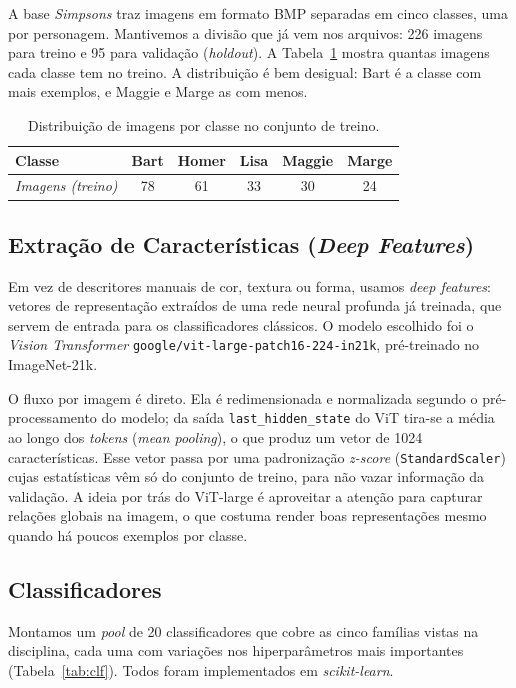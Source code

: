 \documentclass[12pt]{article}
\begin{document}
A base \textit{Simpsons} traz imagens em formato BMP separadas em cinco classes,
uma por personagem. Mantivemos a divisão que já vem nos arquivos: 226 imagens
para treino e 95 para validação (\textit{holdout}). A Tabela~\ref{tab:base}
mostra quantas imagens cada classe tem no treino. A distribuição é bem desigual:
Bart é a classe com mais exemplos, e Maggie e Marge as com menos.

\begin{table}[H]
\centering
\caption{Distribuição de imagens por classe no conjunto de treino.}
\label{tab:base}
\begin{tabular}{lccccc}
\toprule
Classe & Bart & Homer & Lisa & Maggie & Marge \\
\midrule
\textit{Imagens (treino)} & 78 & 61 & 33 & 30 & 24 \\
\bottomrule
\end{tabular}
\end{table}

\subsection{Extração de Características (\textit{Deep Features})}

Em vez de descritores manuais de cor, textura ou forma, usamos
\textit{deep features}: vetores de representação extraídos de uma rede neural
profunda já treinada, que servem de entrada para os classificadores clássicos. O
modelo escolhido foi o \textit{Vision Transformer}
\texttt{google/vit-large-patch16-224-in21k}, pré-treinado no ImageNet-21k.

O fluxo por imagem é direto. Ela é redimensionada e normalizada segundo o
pré-processamento do modelo; da saída \texttt{last\_hidden\_state} do ViT
tira-se a média ao longo dos \textit{tokens} (\textit{mean pooling}), o que
produz um vetor de 1024 características. Esse vetor passa por uma padronização
\textit{z-score} (\texttt{StandardScaler}) cujas estatísticas vêm só do conjunto
de treino, para não vazar informação da validação. A ideia por trás do ViT-large
é aproveitar a atenção para capturar relações globais na imagem, o que costuma
render boas representações mesmo quando há poucos exemplos por classe.

\subsection{Classificadores}

Montamos um \textit{pool} de 20 classificadores que cobre as cinco famílias
vistas na disciplina, cada uma com variações nos hiperparâmetros mais
importantes (Tabela~\ref{tab:clf}). Todos foram implementados em
\textit{scikit-learn}.
\end{document}
